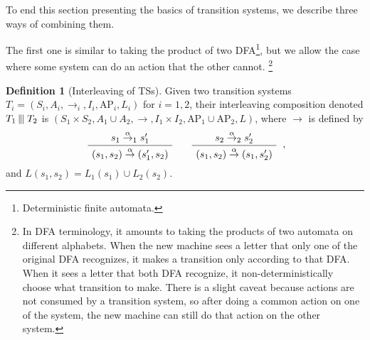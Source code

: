 \documentclass{tufte-handout} %
\theoremstyle{definition}
\newtheorem{defn}[thm]{Definition}
\theoremstyle{remark}
\newcommand{\0}{\textsf{0}}
\newcommand{\1}{\textsf{1}}
\newcommand{\AP}{\text{AP}}
\newcommand{\tmid}{\kern-0.20ex\mid\kern-0.20ex\mid\kern-0.20ex \mid}
\newcommand{\action}[1]{\stackrel{#1}{\rightarrow}}
\newenvironment{bprooftree}
{\leavevmode\hbox\bgroup}
{\DisplayProof\egroup}
\begin{document}
To end this section presenting the basics of transition systems, we describe three ways of combining them.

The first one is similar to taking the product of two DFA\footnote{Deterministic finite automata.}, but we allow the case where some system can do an action that the other cannot. \footnote{In DFA terminology, it amounts to taking the products of two automata on different alphabets. When the new machine sees a letter that only one of the original DFA recognizes, it makes a transition only according to that DFA. When it sees a letter that both DFA recognize, it non-deterministically choose what transition to make. There is a slight caveat because actions are not consumed by a transition system, so after doing a common action on one of the system, the new machine can still do that action on the other system.}
\begin{defn}[Interleaving of TSs]
	Given two transition systems $T_i = (S_i, A_i, \rightarrow_i, I_i, \AP_i, L_i)$ for $i=1,2$, their interleaving composition denoted $T_1 \tmid T_2$ is $(S_1 \times S_2, A_1 \cup A_2, \rightarrow, I_1 \times I_2, \AP_1 \cup \AP_2, L)$, where $\rightarrow$ is defined by 
	\[\begin{bprooftree}
		\AxiomC{$s_1 \action{\alpha}_1 s_1'$}
		\RightLabel{}
		\UnaryInfC{$(s_1, s_2)\action{\alpha}(s_1', s_2)$}
	\end{bprooftree} \quad \begin{bprooftree}
	\AxiomC{$s_2 \action{\alpha}_2 s_2'$}
	\RightLabel{}
	\UnaryInfC{$(s_1, s_2)\action{\alpha}(s_1, s_2')$}
	\end{bprooftree},\]
	and $L(s_1, s_2) =  L_1(s_1) \cup L_2(s_2)$.
\end{defn}
\end{document}
